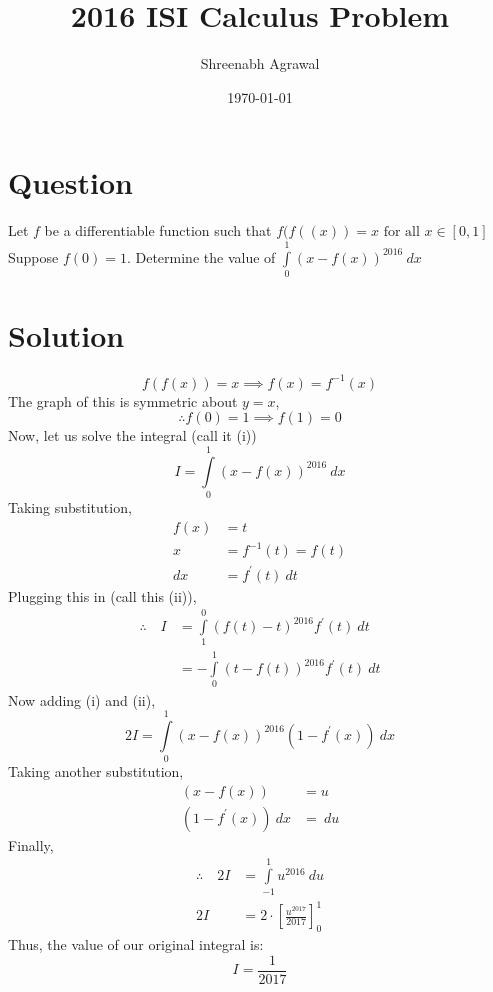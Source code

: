 \documentclass{article}
\title{2016 ISI Calculus Problem}
\author{Shreenabh Agrawal}
\date{\today}
\begin{document}
\maketitle

\section{Question}
Let $f$ be a differentiable function such that $f(f((x))=x \text { for all } x \in[0,1]$ Suppose $f(0)=1 .$ Determine the value of $\int\limits_{0}^{1}(x-f(x))^{2016} \: d x$
\section{Solution}
$$f(f(x))=x \implies
  f(x)=f^{-1}(x)$$
The graph of this is symmetric about $y=x$,
$$\therefore f(0) = 1 \implies f(1) = 0$$
Now, let us solve the integral (call it (i))
$${I}=\int\limits_{0}^{1}(x-f(x))^{2016}\:  d x$$
Taking substitution,
$$\begin{aligned}
f(x) &=t \\
x &=f^{-1}(t)=f(t) \\
d x &=f^{\prime}(t) \: d t
\end{aligned}$$
Plugging this in (call this (ii)),
$$\begin{aligned}
\therefore \quad I &=\int\limits_{1}^{0}(f(t)-t)^{2016} f^{\prime}(t)\: d t \\
&=-\int\limits_{0}^{1}(t-f(t))^{2016} f^{\prime}(t) \:d t
\end{aligned}$$
Now adding (i) and (ii),
$$2 I=\int\limits_{0}^{1}(x-f(x))^{2016}\left(1-f^{\prime}(x)\right) \: d x$$
Taking another substitution,
$$\begin{aligned}
(x - f(x)) &= u\\
(1 - f^{\prime}(x)) \: dx &= \: du
\end{aligned}
$$
Finally,
$$\begin{aligned}
\therefore \quad 2 I  & =  \int\limits_{-1}^{1}  u^{2016}\: d u \\
 2 I &=  2 \cdot\left[\frac{u^{2017}}{2017}\right]_{0}^{1}
\end{aligned}$$
Thus, the value of our original integral is:
$$\boxed{I = \frac{1}{2017}}$$
\end{document}
